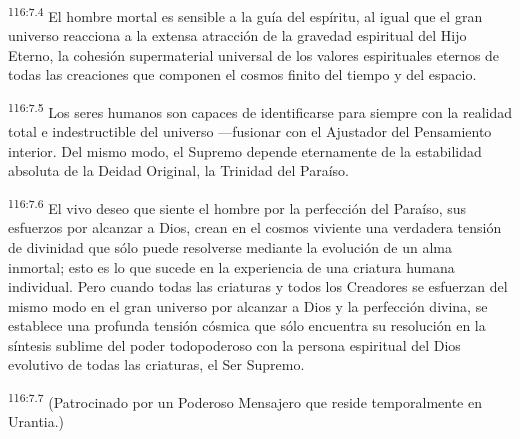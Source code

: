 \par
\textsuperscript{116:7.4} El hombre mortal es sensible a la guía del espíritu, al igual que el gran universo reacciona a la extensa atracción de la gravedad espiritual del Hijo Eterno, la cohesión supermaterial universal de los valores espirituales eternos de todas las creaciones que componen el cosmos finito del tiempo y del espacio.

\par
\textsuperscript{116:7.5} Los seres humanos son capaces de identificarse para siempre con la realidad total e indestructible del universo ---fusionar con el Ajustador del Pensamiento interior. Del mismo modo, el Supremo depende eternamente de la estabilidad absoluta de la Deidad Original, la Trinidad del Paraíso.

\par
\textsuperscript{116:7.6} El vivo deseo que siente el hombre por la perfección del Paraíso, sus esfuerzos por alcanzar a Dios, crean en el cosmos viviente una verdadera tensión de divinidad que sólo puede resolverse mediante la evolución de un alma inmortal; esto es lo que sucede en la experiencia de una criatura humana individual. Pero cuando todas las criaturas y todos los Creadores se esfuerzan del mismo modo en el gran universo por alcanzar a Dios y la perfección divina, se establece una profunda tensión cósmica que sólo encuentra su resolución en la síntesis sublime del poder todopoderoso con la persona espiritual del Dios evolutivo de todas las criaturas, el Ser Supremo.

\par
\textsuperscript{116:7.7} (Patrocinado por un Poderoso Mensajero que reside temporalmente en Urantia.)